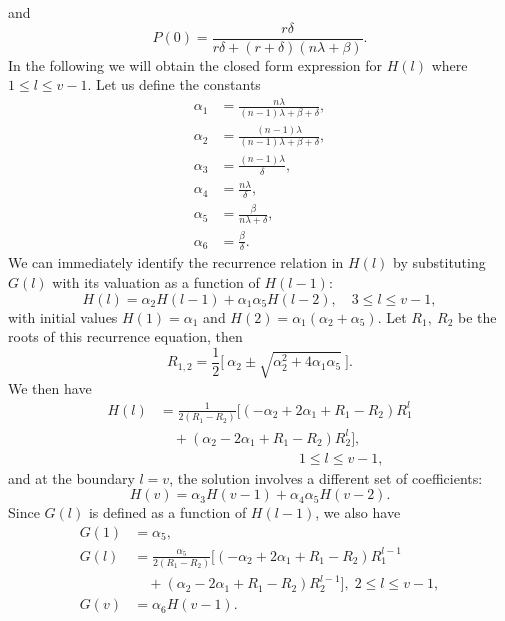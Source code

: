 \documentclass{article}
\begin{document}
and
\begin{equation}\label{eq:P0_FirstModel}
P(0) = \frac{r\delta}{r\delta+(r+\delta)(n\lambda+\beta)} .
\end{equation}
In the following we will obtain the closed form expression for
$H(l)$ where $1\leq l \leq v-1$. Let us define the constants
\begin{align}
\alpha_1 &= \frac{n\lambda}{(n-1)\lambda+\beta+\delta}, \\
\alpha_2 &= \frac{(n-1)\lambda}{(n-1)\lambda+\beta+\delta},
\nonumber \\
\alpha_3 &= \frac{(n-1)\lambda}{\delta}, \nonumber\\
\alpha_4 &= \frac{n\lambda}{\delta}, \nonumber\\
\alpha_5 &= \frac{\beta}{n\lambda+\delta}, \nonumber\\
\alpha_6 &= \frac{\beta}{\delta}. \nonumber
\end{align}
We can immediately identify the recurrence relation in $H(l)$ by
substituting $G(l)$ with its valuation as a function of $H(l-1)$:
\begin{equation}\label{rec}
H(l) = \alpha_2 H(l-1) + \alpha_1 \alpha_5 H(l-2), \quad 3\leq l
\leq v-1 ,
\end{equation}
with initial values $H(1)=\alpha_1$ and
$H(2)=\alpha_1(\alpha_2+\alpha_5)$. Let $R_1,~R_2$ be the roots of
this recurrence equation, then
\begin{equation}
R_{1,2} = \frac{1}{2} \bigg[~\alpha_2 \pm \sqrt{\alpha_2^2+
4\alpha_1\alpha_5} ~\bigg] \nonumber .
\end{equation}
We then have
\begin{equation}\label{eq:ClosedFormSolution_Hl}
\begin{split}
H(l) &= \frac{1}{2 (R_1-R_2)} \Big[
(-\alpha_2+2\alpha_1+R_1-R_2) R_1^l \\
&\quad + (\alpha_2-2\alpha_1+R_1-R_2) R_2^l \Big]  , \\
&\qquad\qquad\qquad\qquad\qquad 1 \leq l \leq v-1,
\end{split}
\end{equation}
and at the boundary $l=v$, the solution involves a different set
of coefficients:
\begin{equation}
H(v) = \alpha_3 H(v-1) + \alpha_4\alpha_5 H(v-2).
\end{equation}
Since $G(l)$ is defined as a function of $H(l-1)$, we also have
\begin{align}\label{eq:ClosedFormSolution_Gl}
G(1) &= \alpha_5 ,\\
G(l) &= \frac{\alpha_5}{2 (R_1-R_2)} \Big[ (-\alpha_2+2\alpha_1+R_1-R_2 ) R_1^{l-1} \nonumber \\
&\quad + (\alpha_2-2\alpha_1+R_1-R_2) R_2^{l-1} \Big] ,\;  2 \leq
l \leq v-1 ,
\nonumber\\
G(v) &= \alpha_6 H(v-1)  .\nonumber
\end{align}
\end{document}
